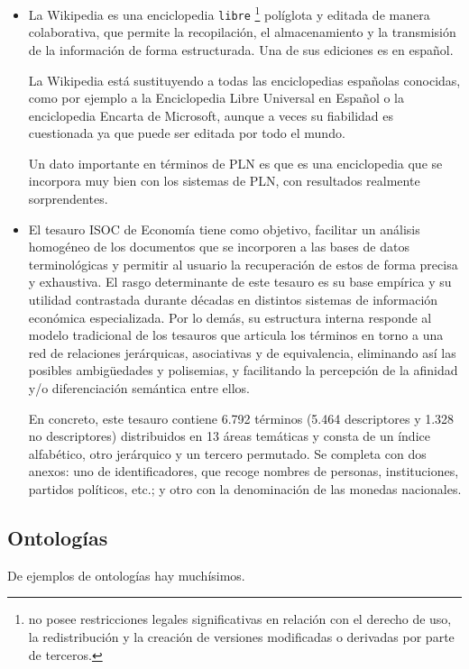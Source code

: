 \documentclass[11pt]{exam}
\begin{document}
\begin{questions}
\begin{itemize}
	\item La Wikipedia es una enciclopedia \texttt{libre} \footnote{no posee restricciones legales significativas en relación con el derecho de uso, la redistribución y la creación de versiones modificadas o derivadas por parte de terceros.} políglota y editada de manera colaborativa, que permite la recopilación, el almacenamiento y la transmisión de la información de forma estructurada. Una de sus ediciones es en español.
	
	La Wikipedia está sustituyendo a todas las enciclopedias españolas conocidas, como por ejemplo a la Enciclopedia Libre Universal en Español o la enciclopedia Encarta de Microsoft, aunque a veces su fiabilidad es cuestionada ya que puede ser editada por todo el mundo.
	
	Un dato importante en términos de PLN es que es una enciclopedia que se incorpora muy bien con los sistemas de PLN, con resultados realmente sorprendentes.
	
	\item El tesauro ISOC de Economía tiene como objetivo, facilitar un análisis homogéneo de los documentos que se incorporen a las bases de datos terminológicas y permitir al usuario la recuperación de estos de forma precisa y exhaustiva. El rasgo determinante de este tesauro es su base empírica y su utilidad contrastada durante décadas en distintos sistemas de información económica especializada. Por lo demás, su estructura interna responde al modelo tradicional de los tesauros que articula los términos en torno a una red de relaciones jerárquicas, asociativas y de equivalencia, eliminando así las posibles ambigüedades y polisemias, y facilitando la percepción de la afinidad y/o diferenciación semántica entre ellos. 
	
	En concreto, este tesauro contiene 6.792 términos (5.464 descriptores y 1.328 no descriptores) distribuidos en 13 áreas temáticas y consta de un índice alfabético, otro jerárquico y un tercero permutado. Se completa con dos anexos: uno de identificadores, que recoge nombres de personas, instituciones, partidos políticos, etc.; y otro con la denominación de las monedas nacionales. 
	 
\end{itemize}

\subsection*{Ontologías}

De ejemplos de ontologías hay muchísimos.


\end{questions}
\end{document}

